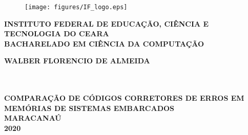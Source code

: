\thispagestyle{empty}

\vfill
 \begin{center}
    \begin{figure}[t]
     \centering
            \texttt{[image: figures/IF\_logo.eps]}\\[-0.1in]
     \end{figure}

    {\large\bfseries INSTITUTO FEDERAL DE EDUCAÇÃO, CIÊNCIA E TECNOLOGIA DO CEARA} \\
    {\large\bfseries BACHARELADO EM CIÊNCIA DA COMPUTAÇÃO}  \\ 

    \vspace*{1in}
    \begin{large} \bfseries WALBER FLORENCIO DE ALMEIDA \end{large}\\[0.4in]

    \vspace*{4cm}
    \noindent \\
    \large\bfseries{COMPARAÇÃO DE CÓDIGOS CORRETORES DE ERROS EM MEMÓRIAS DE SISTEMAS EMBARCADOS} \\
    \vfill
    \large\bfseries{ MARACANAÚ \\ 2020}
\end{center}

\normalsize